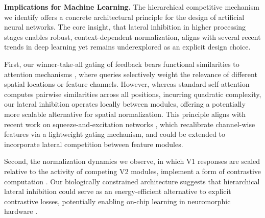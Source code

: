 %
\label{sec:disc_ml}
\textbf{Implications for Machine Learning.} The hierarchical competitive mechanism we identify offers a concrete architectural principle for the design of artificial neural networks. The core insight, that lateral inhibition in higher processing stages enables robust, context-dependent normalization, aligns with several recent trends in deep learning yet remains underexplored as an explicit design choice.

First, our winner-take-all gating of feedback bears functional similarities to attention mechanisms \citep{Desimone1995}, where queries selectively weight the relevance of different spatial locations or feature channels. However, whereas standard self-attention computes pairwise similarities across all positions, incurring quadratic complexity, our lateral inhibition operates locally between modules, offering a potentially more scalable alternative for spatial normalization. This principle aligns with recent work on squeeze-and-excitation networks \citep{Carandini2011}, which recalibrate channel-wise features via a lightweight gating mechanism, and could be extended to incorporate lateral competition between feature modules.

Second, the normalization dynamics we observe, in which V1 responses are scaled relative to the activity of competing V2 modules, implement a form of contrastive computation \citep{Oord2018, Chen2020}. Our biologically constrained architecture suggests that hierarchical lateral inhibition could serve as an energy-efficient alternative to explicit contrastive losses, potentially enabling on-chip learning in neuromorphic hardware \citep{Davies2018}.

